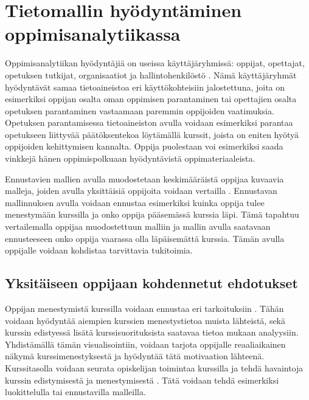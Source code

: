 \chapter{Tietomallin hyödyntäminen oppimisanalytiikassa\label{luku4}}

Oppimisanalytiikan hyödyntäjiä on useissa käyttäjäryhmissä: oppijat, opettajat, opetuksen tutkijat, organisaatiot ja hallintohenkilöstö \citep{romeroEducationalDataMining2010}. Nämä käyttäjäryhmät hyödyntävät samaa tietoaineistoa eri käyttökohteisiin jalostettuna, joita on esimerkiksi oppijan osalta oman oppimisen parantaminen tai opettajien osalta opetuksen parantaminen vastaamaan paremmin oppijoiden vaatimuksia. Opetuksen parantamisessa tietoaineiston avulla voidaan esimerkiksi parantaa opetukseen liittyvää päätöksentekoa löytämällä kurssit, joista on eniten hyötyä oppijoiden kehittymisen kannalta. Oppija puolestaan voi esimerkiksi saada vinkkejä hänen oppimispolkuaan hyödyntävistä oppimateriaaleista.

Ennustavien mallien avulla muodostetaan keskimääräistä oppijaa kuvaavia malleja, joiden avulla yksittäisiä oppijoita voidaan vertailla \citep{wolffImprovingRetentionPredicting2013}. Ennustavan mallinnuksen avulla voidaan ennustaa esimerkiksi kuinka oppija tulee menestymään kurssilla ja onko oppija pääsemässä kurssia läpi. Tämä tapahtuu vertailemalla oppijaa muodostettuun malliin ja mallin avulla saatavaan ennusteeseen onko oppija vaarassa olla läpäisemättä kurssia. Tämän avulla oppijalle voidaan kohdistaa tarvittavia tukitoimia.

\section{Yksitäiseen oppijaan kohdennetut ehdotukset}

Oppijan menestymistä kurssilla voidaan ennustaa eri tarkoituksiin \citep{barberCourseCorrectionUsing2012a}. Tähän voidaan hyödyntää aiempien kurssien menestystietoa muista lähteistä, sekä kurssin edistyessä lisätä kurssisuorituksista saatavaa tietoa mukaan analyysiin. Yhdistämällä tämän visualisointiin, voidaan tarjota oppijalle reaaliaikainen näkymä kurssimenestyksestä ja hyödyntää tätä motivaation lähteenä. Kurssitasolla voidaan seurata opiskelijan toimintaa kurssilla ja tehdä havaintoja kurssin edistymisestä ja menestymisestä \citep{longPenetratingFogAnalytics2011,siemensLearningAnalyticsEmergence2013}. Tätä voidaan tehdä esimerkiksi luokittelulla tai ennustavilla malleilla.

